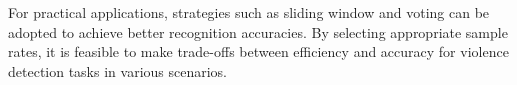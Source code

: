\documentclass[10pt,twocolumn,letterpaper]{article}
\begin{document}
For practical applications, strategies such as sliding window and voting can be adopted to achieve better recognition accuracies. 
By selecting appropriate sample rates, it is feasible to make trade-offs between efficiency and accuracy for violence detection tasks in various scenarios.

{\small


}
\end{document}
